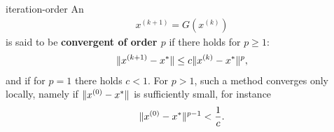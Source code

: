 \begin{Definition}{iteration-order}
  An 
  \begin{gather*}
    x^{(k+1)} = G\left(x^{(k)}\right)
  \end{gather*}
  is said to be \textbf{convergent of order $p$} if there holds for
  $p\ge 1$:
  \begin{gather*}
    \lVert x^{(k+1)}-x^*\rVert \le c \lVert x^{(k)}-x^*\rVert^p,
  \end{gather*}
  and if for $p=1$ there holds $c<1$. For $p>1$, such a method
  converges only locally, namely if $\lVert x^{(0)}-x^*\rVert$ is
  sufficiently small, for instance
  \begin{gather*}
    \lVert x^{(0)}-x^*\rVert^{p-1} < \frac1c.
  \end{gather*}
\end{Definition}
